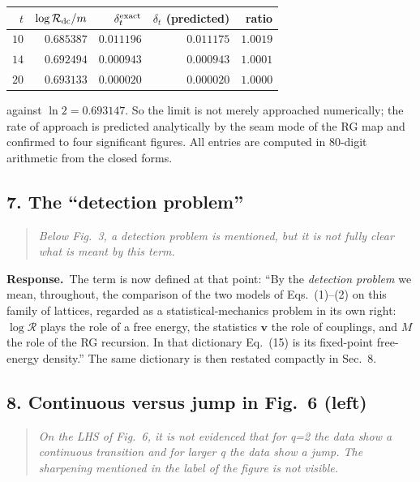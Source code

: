 \documentclass[11pt]{article}
\newcommand{\Rev}{\mathcal{R}}
\newcommand{\logR}{\log \Rev}
\newenvironment{point}{\begin{quote}\itshape}{\end{quote}}
\newcommand{\reply}{\par\noindent\textbf{Response.}\ }
\begin{document}
\begin{center}
\begin{tabular}{rrrrr}
\toprule
$t$ & $\logR_{\rm dc}/m$ & $\delta_t^{\rm exact}$ & $\delta_t$ (predicted) & ratio\\
\midrule
$10$ & $0.685387$ & $0.011196$ & $0.011175$ & $1.0019$\\
$14$ & $0.692494$ & $0.000943$ & $0.000943$ & $1.0001$\\
$20$ & $0.693133$ & $0.000020$ & $0.000020$ & $1.0000$\\
\bottomrule
\end{tabular}
\end{center}

against $\ln2=0.693147$. So the limit is not merely approached numerically; the
rate of approach is predicted analytically by the seam mode of the RG map and
confirmed to four significant figures. All entries are computed in $80$-digit
arithmetic from the closed forms.

\subsection*{7. The ``detection problem''}

\begin{point}
Below Fig.~3, a detection problem is mentioned, but it is not fully clear what
is meant by this term.
\end{point}

\reply The term is now defined at that point: ``By the \emph{detection problem}
we mean, throughout, the comparison of the two models of Eqs.~(1)--(2) on this
family of lattices, regarded as a statistical-mechanics problem in its own
right: $\logR$ plays the role of a free energy, the statistics $\bm v$ the role
of couplings, and $M$ the role of the RG recursion. In that dictionary Eq.~(15)
is its fixed-point free-energy density.'' The same dictionary is then restated
compactly in Sec.~8.

\subsection*{8. Continuous versus jump in Fig.~6 (left)}

\begin{point}
On the LHS of Fig.~6, it is not evidenced that for q=2 the data show a
continuous transition and for larger q the data show a jump. The sharpening
mentioned in the label of the figure is not visible.
\end{point}
\end{document}
